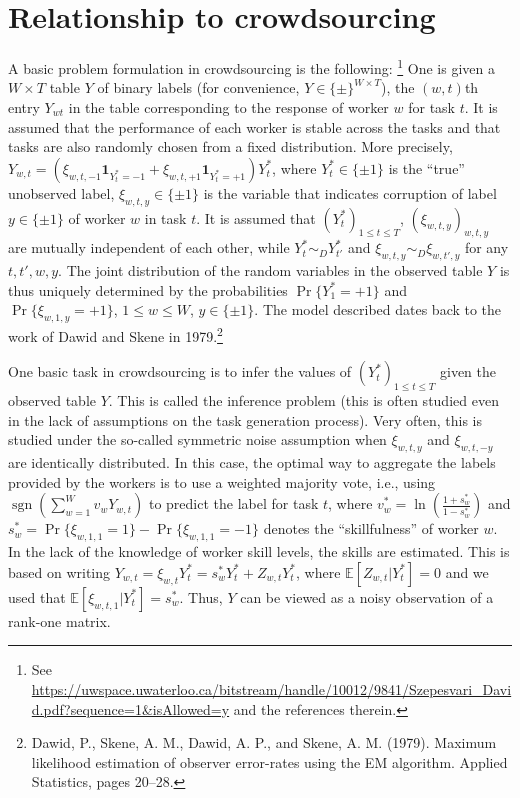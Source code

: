 \documentclass[draft, onecolumn, 12pt]{IEEEtran}
\newcommand{\one}[1]{\boldsymbol{1}_{#1}}
\newcommand{\Prob}[1]{\Pr\{#1\}}
\newcommand{\EE}[1]{\mathbb{E}[#1]}
\DeclareMathOperator{\sgn}{sgn}
\begin{document}
\section{Relationship to crowdsourcing}
A basic problem formulation in crowdsourcing is the following:%
\footnote{
See
\url{https://uwspace.uwaterloo.ca/bitstream/handle/10012/9841/Szepesvari_David.pdf?sequence=1&isAllowed=y}
and the references therein.}
One is given a $W \times T$ table $Y$ of binary labels (for convenience, $Y\in \{\pm \}^{W\times T}$), the $(w,t)$th entry $Y_{wt}$ in the table corresponding to the response of worker $w$ for task $t$. 
It is assumed that the performance of each worker is stable across the tasks and that tasks are also randomly chosen from a fixed distribution. More precisely, $Y_{w,t} = (\xi_{w,t,-1} \one{ Y^*_t=-1} + \xi_{w,t,+1}  \one{ Y^*_t=+1}) Y^*_{t}$, where $Y^*_{t}\in \{\pm 1\}$ is the ``true'' unobserved label, $\xi_{w,t,y}\in \{\pm 1\}$ is the variable that indicates corruption of label $y\in \{\pm 1\}$ of worker $w$ in task $t$. It is assumed that $(Y^*_t)_{1\le t\le T}$, $(\xi_{w,t,y})_{w,t,y}$ are mutually independent of each other,
while $Y^*_t \sim_D Y^*_{t'}$ and $\xi_{w,t,y} \sim_D \xi_{w,t',y}$ for any $t,t',w,y$.
The joint distribution of the random variables in the observed table $Y$ is thus uniquely determined by the probabilities $\Prob{ Y^*_1 = +1 }$ and $\Prob{ \xi_{w,1,y} = +1 }$, $1\le w \le W$, $y\in \{\pm 1\}$. The model described dates back to the work of Dawid and Skene in 1979.\footnote{Dawid,  P.,  Skene,  A. M.,  Dawid,  A. P.,  and Skene,  A. M. (1979).  Maximum likelihood
estimation  of  observer  error-rates  using  the  EM  algorithm. Applied  Statistics,  pages 20--28.}

One basic task in crowdsourcing is to infer the values of $(Y_t^*)_{1\le t\le T}$ given the observed table $Y$. This is called the inference problem (this is often studied even in the lack of assumptions on the task generation process). Very often, this is studied under the so-called symmetric noise assumption when $\xi_{w,t,y}$ and $\xi_{w,t,-y}$ are identically distributed. In this case, the optimal way to aggregate the labels provided by the workers is to use a weighted majority vote, i.e., using $\sgn( \sum_{w=1}^W v_w Y_{w,t} )$ to predict the label for task $t$, where $v_w^* = \ln( \frac{1+s_w^*}{1-s_w^*} )$ and $s_w^* = \Prob{\xi_{w,1,1}=1}-\Prob{\xi_{w,1,1}=-1}$ denotes the ``skillfulness'' of worker $w$.  In the lack of the knowledge of worker skill levels, the skills are estimated. This is based on writing $Y_{w,t} = \xi_{w,t} Y^*_t = s_w^* Y^*_t + Z_{w,t} Y_t^*$, where $\EE{Z_{w,t}|Y^*_t} = 0$ and we used that $\EE{ \xi_{w,t,1}|Y^*_t} = s_w^*$. Thus, $Y$ can be viewed as a noisy observation of a rank-one matrix.
\end{document}
